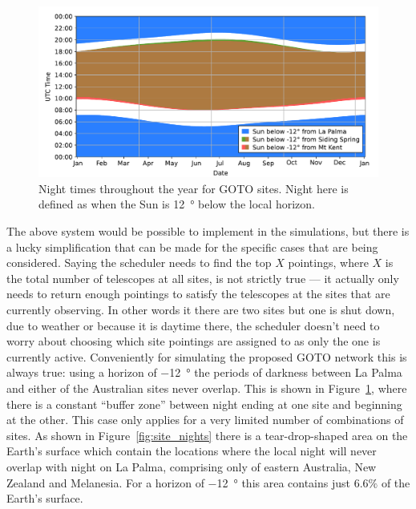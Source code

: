 \begin{colsection}
\begin{colsection}
\begin{figure}[t]
\begin{center}
\includegraphics[width=\linewidth]{images/nights.pdf}
\end{center}

\caption[Night times throughout the year for GOTO sites]{Night times throughout the year for GOTO sites. Night here is defined as when the Sun is \SI{12}{\degree} below the local horizon.
}
\label{fig:nights}
\end{figure}

The above system would be possible to implement in the simulations, but there is a lucky simplification that can be made for the specific cases that are being considered. Saying the scheduler needs to find the top $X$ pointings, where $X$ is the total number of telescopes at all sites, is not strictly true --- it actually only needs to return enough pointings to satisfy the telescopes at the sites that are currently observing. In other words it there are two sites but one is shut down, due to weather or because it is daytime there, the scheduler doesn't need to worry about choosing which site pointings are assigned to as only the one is currently active. Conveniently for simulating the proposed GOTO network this is always true: using a horizon of \SI{-12}{\degree} the periods of darkness between La Palma and either of the Australian sites never overlap. This is shown in Figure~\ref{fig:nights}, where there is a constant ``buffer zone'' between night ending at one site and beginning at the other. This case only applies for a very limited number of combinations of sites. As shown in Figure~\ref{fig:site_nights} there is a tear-drop-shaped area on the Earth's surface which contain the locations where the local night will never overlap with night on La Palma, comprising only of eastern Australia, New Zealand and Melanesia. For a horizon of \SI{-12}{\degree} this area contains just $6.6 \%$ of the Earth's surface.


\end{colsection}
\end{colsection}
